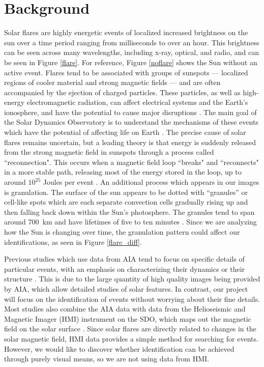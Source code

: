 \documentclass[12pt, letterpaper]{article}
\begin{document}
\section*{Background}

Solar flares are highly energetic events of localized increased brightness on the sun over a time period ranging from milliseconds to over an hour. This brightness can be seen across many wavelengths, including x-ray, optical, and radio, and can be seen in Figure \ref{flare}. For reference, Figure \ref{noflare} shows the Sun without an active event. Flares tend to be associated with groups of sunspots — localized regions of cooler material and strong magnetic fields — and are often accompanied by the ejection of charged particles. These particles, as well as high-energy electromagnetic radiation, can affect electrical systems and the Earth’s ionosphere, and have the potential to cause major disruptions \cite{BOB}. The main goal of the Solar Dynamics Observatory is to understand the mechanisms of these events which have the potential of affecting life on Earth \cite{Pesnell2012}. The precise cause of solar flares remains uncertain, but a leading theory is that energy is suddenly released from the strong magnetic field in sunspots through a process called ``reconnection". This occurs when a magnetic field loop ``breaks" and ``reconnects" in a more stable path, releasing most of the energy stored in the loop, up to around $10^{25}$ Joules per event \cite{BOB}. An additional process which appears in our images is granulation. The surface of the sun appears to be dotted with “granules” or cell-like spots which are each separate convection cells gradually rising up and then falling back down within the Sun’s photosphere. The granules tend to span around 700~km and have lifetimes of five to ten minutes \cite{BOB}. Since we are analyzing how the Sun is changing over time, the granulation pattern could affect our identifications, as seen in Figure \ref{flare_diff}.

Previous studies which use data from AIA tend to focus on specific details of particular events, with an emphasis on characterizing their dynamics \cite{Dai2021}\cite{Chitta2018} or their structure \cite{Aschwanden2017}. This is due to the large quantity of high quality images being provided by AIA, which allow detailed studies of solar features. In contrast, our project will focus on the identification of events without worrying about their fine details. Most studies also combine the AIA data with data from the Helioseismic and Magnetic Imager (HMI) instrument on the SDO, which maps out the magnetic field on the solar surface \cite{Dai2021}\cite{Chitta2018}. Since solar flares are directly related to changes in the solar magnetic field, HMI data provides a simple method for searching for events. However, we would like to discover whether identification can be achieved through purely visual means, so we are not using data from HMI.
\end{document}
